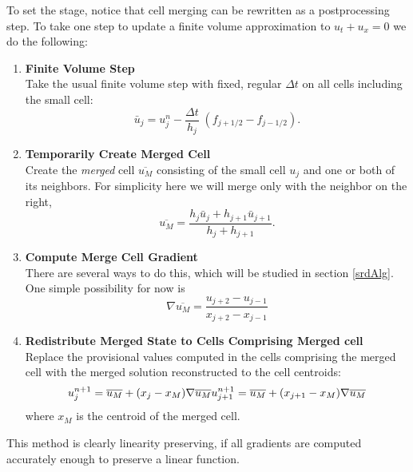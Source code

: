 To set the stage, notice that cell merging can
be rewritten as a postprocessing step.
To take one step to update a finite volume approximation to
$u_t + u_x = 0$ we do the following:
\begin{enumerate}
\setlength\itemsep{.2in}
\item
{\bf Finite Volume Step}\\
Take the usual finite volume step with fixed, regular  $\Delta t$ on all cells 
including the small cell:
\begin{equation}
\bar{u}_j = u_j^n - \frac{\Delta t}{h_j} \; (f_{j+1/2} - f_{j-1/2} )   .
\label{eqn:fvupdate}
\end{equation}

\item
{\bf Temporarily Create Merged Cell}\\
Create the {\em merged} cell $\overline{u_M}$ consisting of the small cell $u_j$ and one
or both of its neighbors. For simplicity here we will merge only with the neighbor
on the right,
\begin{equation}
\overline{u_M} =  \frac{ h_j \bar{u}_j + h_{j+1} \bar{u}_{j+1} } {h_j +
h_{j+1}} .
\label{eqn:mergestep}
\end{equation}

\item
{\bf Compute Merge Cell Gradient }\\
There are several ways to do this, which will be studied in section
\ref{srdAlg}.
One simple possibility for now is
\begin{equation}
\nabla \overline{u_M} = \frac{u_{j+2} - u_{j-1}} {x_{j+2}-x_{j-1}}
\label{eqn:gradLim}
\end{equation}

\item
{\bf Redistribute Merged State to Cells Comprising Merged cell }\\
Replace the provisional values computed in the cells comprising the
merged cell with the merged solution reconstructed to the cell
centroids:
\begin{equation}
u_j^{n+1} = \overline{u_M} +  (x_j - x_M) \nabla \overline{u_M}\\
u_{j+1}^{n+1} = \overline{u_M} +  (x_{j+1} - x_M) \nabla \overline{u_M}
\end{equation}
where $x_M$ is the centroid of the merged cell.  
\end{enumerate}
This method is clearly linearity preserving, if all gradients are
computed accurately enough to preserve a linear function.  

